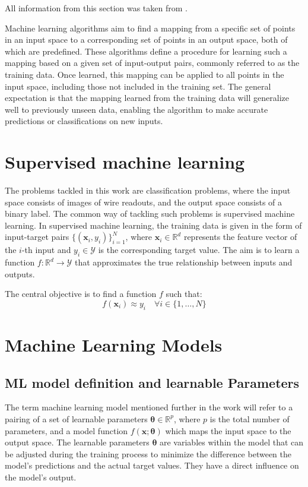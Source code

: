 \documentclass{pracalicmgr}
\begin{document}
All information from this section was taken from \cite{MlBasics}.

Machine learning algorithms aim to find a mapping from a specific set of points in an input space to a corresponding set of points in an output space, both of which are predefined. These algorithms define a procedure for learning such a mapping based on a given set of input-output pairs, commonly referred to as the training data. Once learned, this mapping can be applied to all points in the input space, including those not included in the training set. The general expectation is that the mapping learned from the training data will generalize well to previously unseen data, enabling the algorithm to make accurate predictions or classifications on new inputs.

\section{Supervised machine learning}

The problems tackled in this work are classification problems, where the input space consists of images of wire readouts, and the output space consists of a binary label. The common way of tackling such problems is supervised machine learning.
In supervised machine learning, the training data is given in the form of input-target pairs \( \{(\mathbf{x}_i, y_i)\}_{i=1}^N \), where \( \mathbf{x}_i \in \mathbb{R}^d \) represents the feature vector of the \( i \)-th input and \( y_i \in \mathcal{Y} \) is the corresponding target value. The aim is to learn a function \( f: \mathbb{R}^d \rightarrow \mathcal{Y} \) that approximates the true relationship between inputs and outputs.

The central objective is to find a function \( f \) such that:
\[
f(\mathbf{x}_i) \approx y_i \quad \forall i \in \{1, \dots, N\}
\]

\section{Machine Learning Models}

\subsection{ML model definition and learnable Parameters}

The term machine learning model mentioned further in the work will refer to a pairing of a set of learnable parameters \( \boldsymbol{\theta} \in \mathbb{R}^p \), where \( p \) is the total number of parameters, and a model function \( f(\mathbf{x}; \boldsymbol{\theta}) \) which maps the input space to the output space. The learnable parameters \( \boldsymbol{\theta} \) are variables within the model that can be adjusted during the training process to minimize the difference between the model's predictions and the actual target values. They have a direct influence on the model's output.
\end{document}

